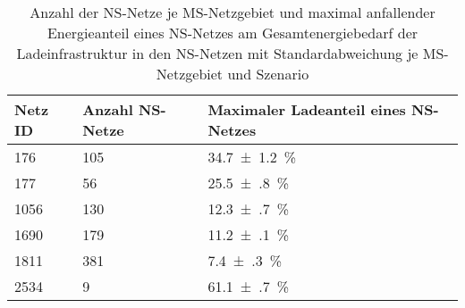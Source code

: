 {
\renewcommand{\arraystretch}{1.2}%
\begin{table}[H]
	\begin{center}
		\caption{Anzahl der NS-Netze je MS-Netzgebiet und maximal anfallender Energieanteil eines NS-Netzes am Gesamtenergiebedarf der Ladeinfrastruktur in den NS-Netzen mit Standardabweichung je MS-Netzgebiet und Szenario}
		\begin{tabu} to 0.8\textwidth {X[0.5] X[1, r] X[2, r]}
			\hline
			Netz ID    & Anzahl NS-Netze & Maximaler Ladeanteil eines NS-Netzes                 \\ \hline
			\num{176}  & \num{105}       & \SI[separate-uncertainty = true]{34.7(12)}{\percent} \\
			\num{177}  & \num{56}        & \SI[separate-uncertainty = true]{25.5(8)}{\percent}  \\
			\num{1056} & \num{130}       & \SI[separate-uncertainty = true]{12.3(7)}{\percent}  \\
			\num{1690} & \num{179}       & \SI[separate-uncertainty = true]{11.2(1)}{\percent}  \\
			\num{1811} & \num{381}       & \SI[separate-uncertainty = true]{7.4(3)}{\percent}   \\
			\num{2534} & \num{9}         & \SI[separate-uncertainty = true]{61.1(7)}{\percent}  \\ \hline
		\end{tabu}
		\label{tab:largestLVGridShare}
	\end{center}
	\vspace{-3mm}%
\end{table}
}